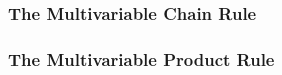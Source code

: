 





\subsubsection{The Multivariable Chain Rule}
















\subsubsection{The Multivariable Product Rule}

